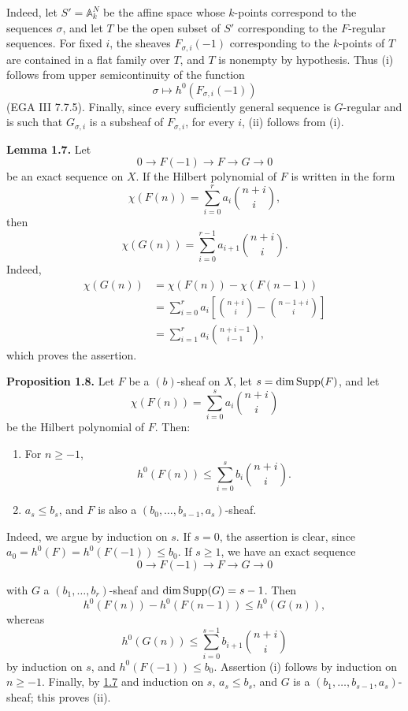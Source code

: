 \newpage
Indeed, let \(S'=\mathbb A_k^N\) be the affine space whose \(k\)-points
correspond to the sequences \(\sigma\), and let \(T\) be the open subset of
\(S'\) corresponding to the \(F\)-regular sequences. For fixed \(i\), the
sheaves \(F_{\sigma,i}(-1)\) corresponding to the \(k\)-points of \(T\) are
contained in a flat family over \(T\), and \(T\) is nonempty by hypothesis.
Thus (i) follows from upper semicontinuity of the function
\[
  \sigma\longmapsto h^0(F_{\sigma,i}(-1))
\]
(EGA III 7.7.5). Finally, since every sufficiently general sequence is
\(G\)-regular and is such that \(G_{\sigma,i}\) is a subsheaf of
\(F_{\sigma,i}\), for every \(i\), (ii) follows from (i).

\textbf{Lemma 1.7.} Let
\[
  0\longrightarrow F(-1)\longrightarrow F\longrightarrow G\longrightarrow0
\]
be an exact sequence on \(X\). If the Hilbert polynomial of \(F\) is written
in the form
\[
  \chi(F(n))=\sum_{i=0}^{r}a_i\binom{n+i}{i},
\]
then
\[
  \chi(G(n))=\sum_{i=0}^{r-1}a_{i+1}\binom{n+i}{i}.
\]
Indeed,
\[
\begin{aligned}
  \chi(G(n))
  &=\chi(F(n))-\chi(F(n-1))\\
  &=\sum_{i=0}^{r}a_i
    \left[\binom{n+i}{i}-\binom{n-1+i}{i}\right]\\
  &=\sum_{i=1}^{r}a_i\binom{n+i-1}{i-1},
\end{aligned}
\]
which proves the assertion.

\textbf{Proposition 1.8.} Let \(F\) be a \((b)\)-sheaf on \(X\), let
\(s=\dim\operatorname{Supp}(F)\), and let
\[
  \chi(F(n))=\sum_{i=0}^{s}a_i\binom{n+i}{i}
\]
be the Hilbert polynomial of \(F\). Then:
\begin{enumerate}[label=(\roman*)]
\item For \(n\geq-1\),
\[
  h^0(F(n))\leq\sum_{i=0}^{s}b_i\binom{n+i}{i}.
\]
\item \(a_s\leq b_s\), and \(F\) is also a
\((b_0,\ldots,b_{s-1},a_s)\)-sheaf.
\end{enumerate}
Indeed, we argue by induction on \(s\). If \(s=0\), the assertion is clear,
since \(a_0=h^0(F)=h^0(F(-1))\leq b_0\). If \(s\geq1\), we have an exact
sequence
\[
  0\longrightarrow F(-1)\longrightarrow F\longrightarrow G\longrightarrow0
\]

\newpage
with \(G\) a \((b_1,\ldots,b_r)\)-sheaf and
\(\dim\operatorname{Supp}(G)=s-1\). Then
\[
  h^0(F(n))-h^0(F(n-1))\leq h^0(G(n)),
\]
whereas
\[
  h^0(G(n))\leq
  \sum_{i=0}^{s-1}b_{i+1}\binom{n+i}{i}
\]
by induction on \(s\), and \(h^0(F(-1))\leq b_0\). Assertion (i) follows
by induction on \(n\geq-1\). Finally, by \hyperlink{sga6.e13.lem.1-7}{1.7} and induction on \(s\),
\(a_s\leq b_s\), and \(G\) is a
\((b_1,\ldots,b_{s-1},a_s)\)-sheaf; this proves (ii).

